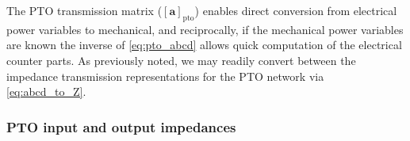 \documentclass[lettersize,journal]{IEEEtran}
\begin{document}
\clearpage

%
The PTO transmission matrix ($\left[ \mathbf{a} \right]_{\textrm{pto}}$) enables direct conversion from electrical power variables to mechanical, and reciprocally, if the mechanical power variables are known the inverse of \eqref{eq:pto_abcd} allows quick computation of the electrical counter parts.
As previously noted, we may readily convert between the impedance transmission representations for the PTO network via \eqref{eq:abcd_to_Z}.

\subsubsection{PTO input and output impedances}\label{sec:pto_input_and_output_impedances}
\end{document}
